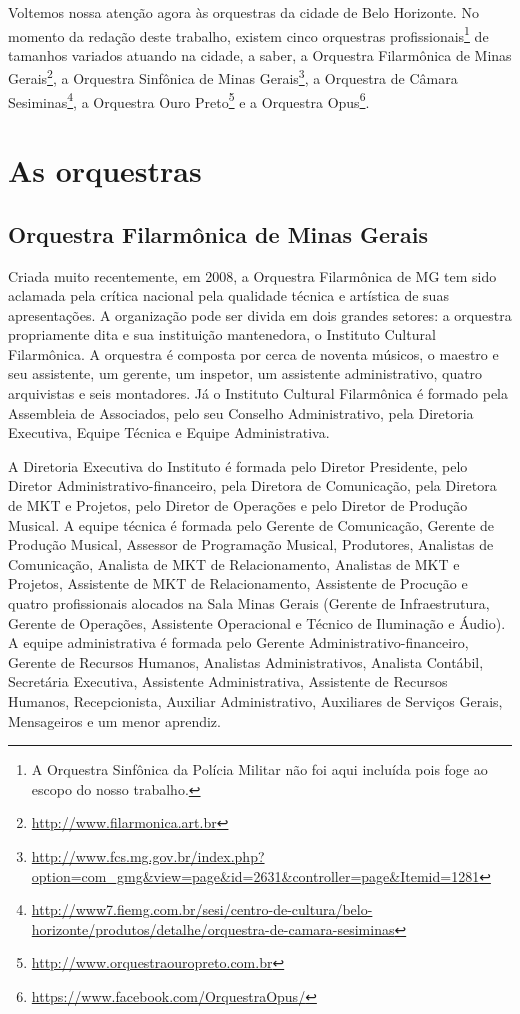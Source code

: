 \documentclass[a4paper, 12pt, openright, oneside, german, french, english, brazil]{abntex2}
\begin{document}
	
	Voltemos nossa atenção agora às orquestras da cidade de Belo Horizonte. No momento da redação deste trabalho, existem cinco orquestras profissionais\footnote{A Orquestra Sinfônica da Polícia Militar não foi aqui incluída pois foge ao escopo do nosso trabalho.} de tamanhos variados atuando na cidade, a saber, a Orquestra Filarmônica de Minas Gerais\footnote{\url{http://www.filarmonica.art.br}}, a Orquestra Sinfônica de Minas Gerais\footnote{\url{http://www.fcs.mg.gov.br/index.php?option=com_gmg&view=page&id=2631&controller=page&Itemid=1281}}, a Orquestra de Câmara Sesiminas\footnote{\url{http://www7.fiemg.com.br/sesi/centro-de-cultura/belo-horizonte/produtos/detalhe/orquestra-de-camara-sesiminas}}, a Orquestra Ouro Preto\footnote{\url{http://www.orquestraouropreto.com.br}} e a Orquestra Opus\footnote{\url{https://www.facebook.com/OrquestraOpus/}}.

	\chapter{As orquestras}

	\section{Orquestra Filarmônica de Minas Gerais}\label{cap:filarmonica}

	

	Criada muito recentemente, em 2008, a Orquestra Filarmônica de MG tem sido aclamada pela crítica nacional pela qualidade técnica e artística de suas apresentações. A organização pode ser divida em dois grandes setores: a orquestra propriamente dita e sua instituição mantenedora, o Instituto Cultural Filarmônica. A orquestra é composta por cerca de noventa músicos, o maestro e seu assistente, um gerente, um inspetor, um assistente administrativo, quatro arquivistas e seis montadores. Já o Instituto Cultural Filarmônica é formado pela Assembleia de Associados, pelo seu Conselho Administrativo, pela Diretoria Executiva, Equipe Técnica e Equipe Administrativa.



	A Diretoria Executiva do Instituto é formada pelo Diretor Presidente, pelo Diretor Administrativo-financeiro, pela Diretora de Comunicação, pela Diretora de MKT e Projetos, pelo Diretor de Operações e pelo Diretor de Produção Musical. A equipe técnica é formada pelo Gerente de Comunicação, Gerente de Produção Musical, Assessor de Programação Musical, Produtores, Analistas de Comunicação, Analista de MKT de Relacionamento, Analistas de MKT e Projetos, Assistente de MKT de Relacionamento, Assistente de Procução e quatro profissionais alocados na Sala Minas Gerais (Gerente de Infraestrutura, Gerente de Operações, Assistente Operacional e Técnico de Iluminação e Áudio). A equipe administrativa é formada pelo Gerente Administrativo-financeiro, Gerente de Recursos Humanos, Analistas Administrativos, Analista Contábil, Secretária Executiva, Assistente Administrativa, Assistente de Recursos Humanos, Recepcionista, Auxiliar Administrativo, Auxiliares de Serviços Gerais, Mensageiros e um menor aprendiz.
\end{document}
